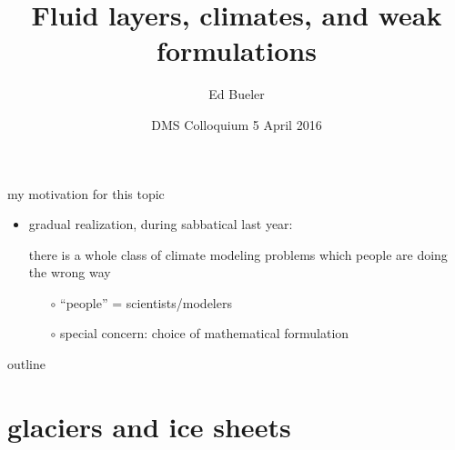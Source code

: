 \documentclass[xcolor={dvipsnames}]{beamer}
\title{Fluid layers, climates, and weak formulations}
\author{Ed Bueler}
\institute[UAF] %
{
  Dept of Mathematics and Statistics, and Geophysical Institute\\
  University of Alaska Fairbanks \\
  \tiny (\emph{funded by NASA Modeling, Analysis, and Prediction program})%
}
\date{DMS Colloquium 5 April 2016}
\begin{document}
\graphicspath{{../obstacle/}{../cartoon/}{../refinemass/}{../../images/}{../../../talks-public/commonfigs/}{../../../sia-fve/talks/}}

\begin{frame}
  \titlepage
\end{frame}


\begin{frame}{my motivation for this topic}
\begin{itemize}
\item gradual realization, during sabbatical last year:
\begin{center}
\alert{there is a whole class of climate modeling problems which people are doing the wrong way}
\end{center}
  \begin{itemize}
  \item[$\circ$] ``people'' = scientists/modelers
  \item[$\circ$] special concern: choice of mathematical formulation
  \end{itemize}
\end{itemize}

\end{frame}


\begin{frame}{outline}
  \tableofcontents
\end{frame}


\section{glaciers and ice sheets}
\end{document}
